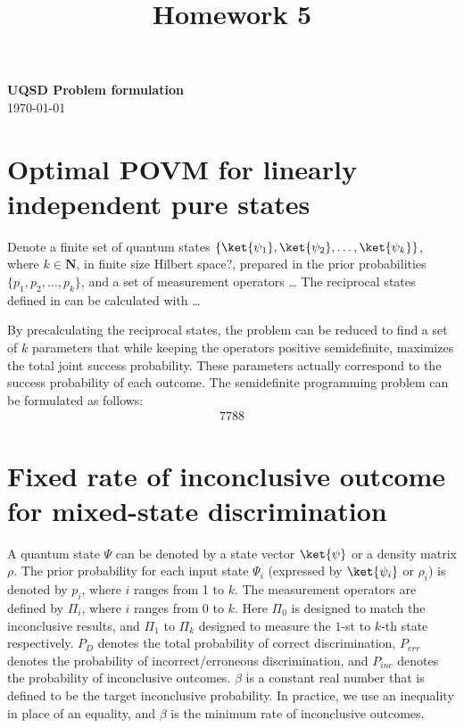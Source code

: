 \documentclass[11pt]{article}
\theoremstyle{definition}
\begin{document}
\title{Homework 5}

\thispagestyle{empty}

\begin{center}
    {\LARGE \bf UQSD Problem formulation}\\
    \bigskip
    \today\\
\end{center}

\section{Optimal POVM for linearly independent pure states}
Denote a finite set of quantum states $\{\ket{\psi_{1}}, \ket{\psi_{2}}, \dots, \ket{\psi_{k}}\}$,
where $k \in \mathbf{N}$, in finite size Hilbert space?, prepared in the prior probabilities
$\{p_{1}, p_{2}, \dots, p_{k}\}$,
and a set of measurement operators \dots
The reciprocal states defined in %
can be calculated with \dots

By precalculating the reciprocal states, the problem can be reduced to find a set of $k$ parameters that
while keeping the operators positive semidefinite, maximizes the total joint success probability.
These parameters actually correspond to the success probability of each outcome.
The semidefinite programming problem can be formulated as follows:
\begin{align*}
    7788
\end{align*}

\section{Fixed rate of inconclusive outcome for mixed-state discrimination}
A quantum state $\Psi$ can be denoted by a state vector $\ket{\psi}$ or a density matrix $\rho$.
The prior probability for each input state $\Psi_{i}$ (expressed by $\ket{\psi_{i}}$ or $\rho_{i}$) is
denoted by $p_{i}$, where $i$ ranges from 1 to $k$.
The measurement operators are defined by $\Pi_{i}$, where $i$ ranges from 0 to $k$.
Here $\Pi_{0}$ is designed to match the inconclusive results,
and $\Pi_{1}$ to $\Pi_{k}$ designed to measure the $1$-st to $k$-th state respectively.
$P_{D}$ denotes the total probability of correct discrimination,
$P_{err}$ denotes the probability of incorrect/erroneous discrimination,
and $P_{inc}$ denotes the probability of inconclusive outcomes.
$\beta$ is a constant real number that is defined to be the target inconclusive probability.
In practice, we use an inequality in place of an equality,
and $\beta$ is the minimum rate of inconclusive outcomes.
\end{document}
